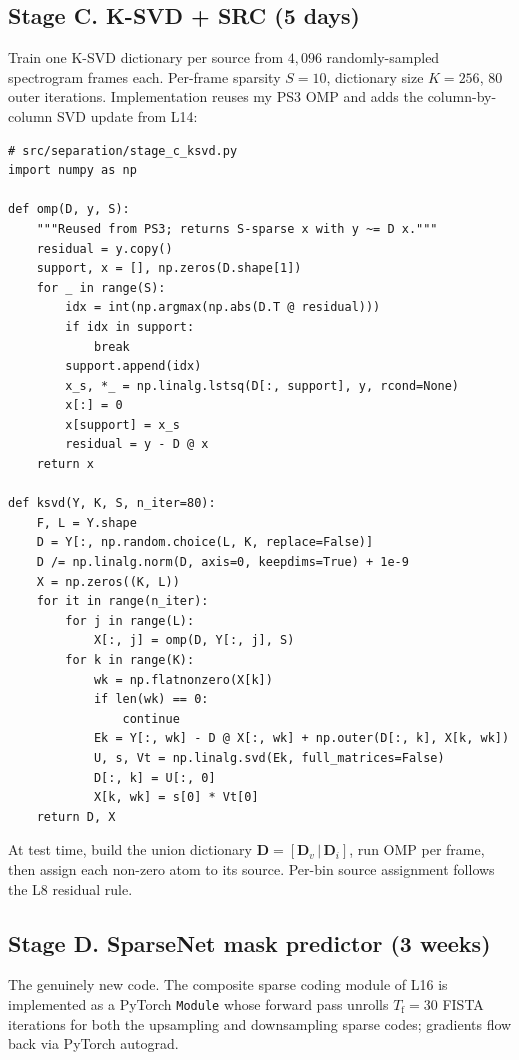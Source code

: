 \documentclass[10pt]{article}
\begin{document}
\subsection{Stage C. K-SVD + SRC (5 days)}
Train one K-SVD dictionary per source from $4{,}096$ randomly-sampled
spectrogram frames each.  Per-frame sparsity $S\!=\!10$, dictionary size
$K\!=\!256$, $80$ outer iterations.  Implementation reuses my PS3 OMP
and adds the column-by-column SVD update from L14:

\begin{lstlisting}
# src/separation/stage_c_ksvd.py
import numpy as np

def omp(D, y, S):
    """Reused from PS3; returns S-sparse x with y ~= D x."""
    residual = y.copy()
    support, x = [], np.zeros(D.shape[1])
    for _ in range(S):
        idx = int(np.argmax(np.abs(D.T @ residual)))
        if idx in support:
            break
        support.append(idx)
        x_s, *_ = np.linalg.lstsq(D[:, support], y, rcond=None)
        x[:] = 0
        x[support] = x_s
        residual = y - D @ x
    return x

def ksvd(Y, K, S, n_iter=80):
    F, L = Y.shape
    D = Y[:, np.random.choice(L, K, replace=False)]
    D /= np.linalg.norm(D, axis=0, keepdims=True) + 1e-9
    X = np.zeros((K, L))
    for it in range(n_iter):
        for j in range(L):
            X[:, j] = omp(D, Y[:, j], S)
        for k in range(K):
            wk = np.flatnonzero(X[k])
            if len(wk) == 0:
                continue
            Ek = Y[:, wk] - D @ X[:, wk] + np.outer(D[:, k], X[k, wk])
            U, s, Vt = np.linalg.svd(Ek, full_matrices=False)
            D[:, k] = U[:, 0]
            X[k, wk] = s[0] * Vt[0]
    return D, X
\end{lstlisting}

At test time, build the union dictionary $\bm{D}\!=\![\bm{D}_v\,|\,\bm{D}_i]$,
run OMP per frame, then assign each non-zero atom to its source.
Per-bin source assignment follows the L8 residual rule.

\subsection{Stage D. SparseNet mask predictor (3 weeks)}
\label{sec:scn-code}
The genuinely new code.  The composite sparse coding module of L16 is
implemented as a PyTorch \texttt{Module} whose forward pass unrolls
$T_\text{f}\!=\!30$ FISTA iterations for both the upsampling and
downsampling sparse codes; gradients flow back via PyTorch autograd.
\end{document}
